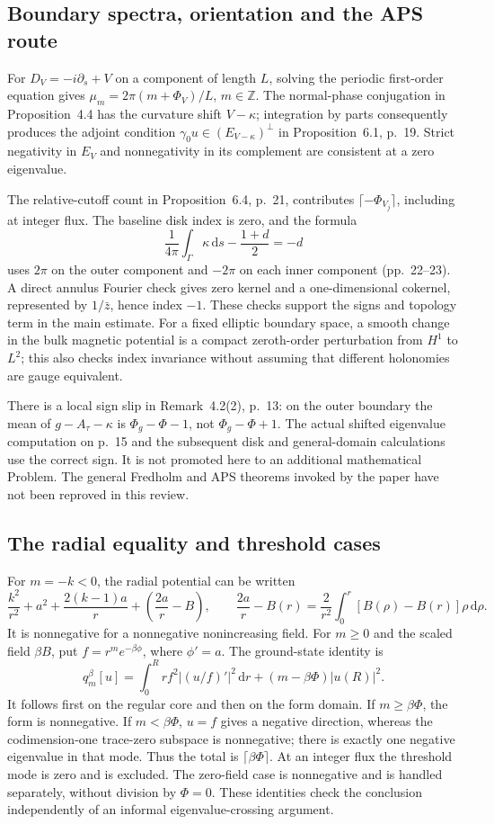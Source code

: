 \documentclass[10pt]{article}
\begin{document}
\subsection*{Boundary spectra, orientation and the APS route}
For \(D_V=-i\partial_s+V\) on a component of length \(L\), solving the periodic first-order equation gives \(\mu_m=2\pi(m+\Phi_V)/L\), \(m\in\mathbb Z\). The normal-phase conjugation in Proposition 4.4 has the curvature shift \(V-\kappa\); integration by parts consequently produces the adjoint condition \(\gamma_0u\in(E_{V-\kappa})^\perp\) in Proposition 6.1, p. 19. Strict negativity in \(E_V\) and nonnegativity in its complement are consistent at a zero eigenvalue.\par
The relative-cutoff count in Proposition 6.4, p. 21, contributes \(\lceil-\Phi_{V_j}\rceil\), including at integer flux. The baseline disk index is zero, and the formula \[\frac{1}{4\pi}\int_\Gamma\kappa\,\mathrm ds-\frac{1+d}{2}=-d\] uses \(2\pi\) on the outer component and \(-2\pi\) on each inner component (pp. 22–23). A direct annulus Fourier check gives zero kernel and a one-dimensional cokernel, represented by \(1/\bar z\), hence index \(-1\). These checks support the signs and topology term in the main estimate. For a fixed elliptic boundary space, a smooth change in the bulk magnetic potential is a compact zeroth-order perturbation from \(H^1\) to \(L^2\); this also checks index invariance without assuming that different holonomies are gauge equivalent.\par
There is a local sign slip in Remark 4.2(2), p. 13: on the outer boundary the mean of \(g-A_\tau-\kappa\) is \(\Phi_g-\Phi-1\), not \(\Phi_g-\Phi+1\). The actual shifted eigenvalue computation on p. 15 and the subsequent disk and general-domain calculations use the correct sign. It is not promoted here to an additional mathematical Problem. The general Fredholm and APS theorems invoked by the paper have not been reproved in this review.\par
\subsection*{The radial equality and threshold cases}
For \(m=-k<0\), the radial potential can be written \[\frac{k^2}{r^2}+a^2+\frac{2(k-1)a}{r}
                     +\left(\frac{2a}{r}-B\right),\qquad
 \frac{2a}{r}-B(r)
   =\frac{2}{r^2}\int_0^r[B(\rho)-B(r)]\rho\,\mathrm d\rho .\] It is nonnegative for a nonnegative nonincreasing field. For \(m\geq0\) and the scaled field \(\beta B\), put \(f=r^m e^{-\beta\phi}\), where \(\phi'=a\). The ground-state identity is \[q_m^\beta[u]=
 \int_0^R r f^2\left|(u/f)'\right|^2\,\mathrm dr
       +(m-\beta\Phi)|u(R)|^2 .\] It follows first on the regular core and then on the form domain. If \(m\geq\beta\Phi\), the form is nonnegative. If \(m<\beta\Phi\), \(u=f\) gives a negative direction, whereas the codimension-one trace-zero subspace is nonnegative; there is exactly one negative eigenvalue in that mode. Thus the total is \(\lceil\beta\Phi\rceil\). At an integer flux the threshold mode is zero and is excluded. The zero-field case is nonnegative and is handled separately, without division by \(\Phi=0\). These identities check the conclusion independently of an informal eigenvalue-crossing argument.\par
\end{document}
